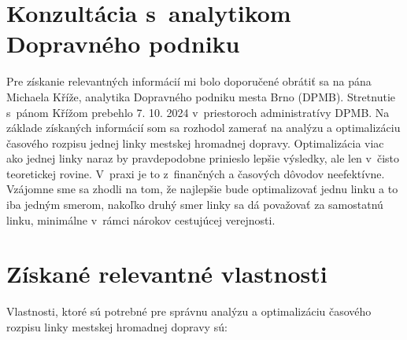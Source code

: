 \section{Konzultácia s~analytikom Dopravného podniku}
Pre získanie relevantných informácií mi bolo doporučené obrátiť sa na pána Michaela Kříže, analytika Dopravného podniku mesta Brno (DPMB).
Stretnutie s~pánom Křížom prebehlo 7. 10. 2024 v~priestoroch administratívy DPMB.
Na základe získaných informácií som sa rozhodol zamerať na analýzu a optimalizáciu časového rozpisu jednej linky mestskej hromadnej dopravy.
Optimalizácia viac ako jednej linky naraz by pravdepodobne prinieslo lepšie výsledky, ale len v~čisto teoretickej rovine.
V~praxi je to z~finančných a časových dôvodov neefektívne.
Vzájomne sme sa zhodli na tom, že najlepšie bude optimalizovať jednu linku a to iba jedným smerom, nakoľko druhý smer linky sa dá považovať za samostatnú linku, minimálne v~rámci nárokov cestujúcej verejnosti.

\section{Získané relevantné vlastnosti}

Vlastnosti, ktoré sú potrebné pre správnu analýzu a optimalizáciu časového rozpisu linky mestskej hromadnej dopravy sú:

